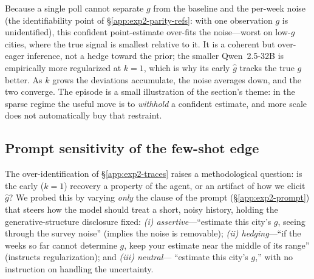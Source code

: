 \documentclass{article} %
\begin{document}
Because a single poll cannot separate $g$ from the baseline and the per-week noise (the
identifiability point of \S\ref{app:exp2-parity-refs}: with one observation $g$ is unidentified),
this confident point-estimate over-fits the noise---worst on low-$g$ cities, where the true signal is
smallest relative to it. It is a coherent but over-eager inference, not a hedge toward the prior; the
smaller Qwen~2.5-32B is empirically more regularized at $k{=}1$, which is why its early $\hat g$
tracks the true $g$ better. As $k$ grows the deviations accumulate, the noise averages down, and the
two converge. The episode is a small illustration of the section's theme: in the sparse regime the
useful move is to \emph{withhold} a confident estimate, and more scale does not automatically buy
that restraint.

\subsection{Prompt sensitivity of the few-shot edge}
\label{app:exp2-promptsens}

The over-identification of \S\ref{app:exp2-traces} raises a methodological question: is the early
($k{=}1$) recovery a property of the agent, or an artifact of how we elicit $\hat g$? We probed this
by varying \emph{only} the clause of the prompt (\S\ref{app:exp2-prompt}) that steers how the model
should treat a short, noisy history, holding the generative-structure disclosure fixed:
\emph{(i) assertive}---``estimate this city's $g$, seeing through the survey noise'' (implies the
noise is removable); \emph{(ii) hedging}---``if the weeks so far cannot determine $g$, keep your
estimate near the middle of its range'' (instructs regularization); and \emph{(iii) neutral}---
``estimate this city's $g$,'' with no instruction on handling the uncertainty.
\end{document}
